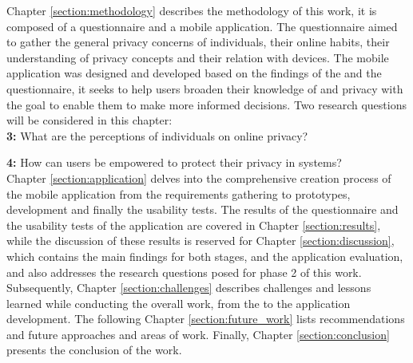 Chapter \ref{section:methodology} describes the methodology of this work, it is composed of a
questionnaire and a mobile application. The questionnaire aimed to gather
the general privacy concerns of individuals, their online habits, their
understanding of privacy concepts and their relation with \hyperlink{\acronym}{\acronym} devices.
The mobile application was designed and developed based on the findings
of the \hyperlink{\acronym}{\acronym} and the questionnaire, it seeks to help users broaden their
knowledge of \hyperlink{\acronym}{\acronym} and privacy with the goal to enable them to make more
informed decisions. Two research questions will be considered in this
chapter:\\


\textbf{\hyperlink{\acronym}{\acronym}3:} What are the perceptions of individuals on online privacy?

\textbf{\hyperlink{\acronym}{\acronym}4:} How can users be empowered to protect their privacy in \hyperlink{\acronym}{\acronym} systems?\\

Chapter \ref{section:application} delves into the comprehensive creation process
of the mobile application from the requirements gathering to prototypes, development
and finally the usability tests.
The results of the questionnaire and the usability tests of the application are
covered in Chapter \ref{section:results}, while the discussion of these results is reserved for
Chapter \ref{section:discussion}, which contains the main findings for both stages, \hyperlink{\acronym}{\acronym} and the
application evaluation, and also addresses the research questions posed for phase 2 of
this work. Subsequently, Chapter \ref{section:challenges} describes challenges and lessons
learned while conducting the overall work, from the \hyperlink{\acronym}{\acronym} to the application
development. The following Chapter \ref{section:future_work} lists recommendations and future approaches and areas of work.
Finally, Chapter \ref{section:conclusion} presents the conclusion of the work.
